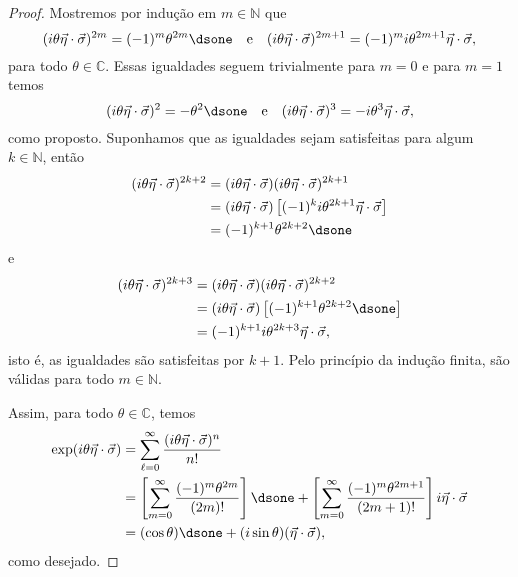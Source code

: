 \begin{proof}
    Mostremos por indução em \(m \in \mathbb{N}\) que
    \begin{equation*}
        (i\theta\vec \eta \cdot \vec \sigma)^{2m} = (-1)^m\theta^{2m}\dsone\quad\text{e}\quad(i\theta\vec \eta \cdot \vec \sigma)^{2m+1} = (-1)^{m}i\theta^{2m+1}\vec \eta \cdot \vec \sigma,
    \end{equation*}
    para todo \(\theta \in \mathbb{C}\). Essas igualdades seguem trivialmente para \(m = 0\) e para \(m = 1\) temos
    \begin{equation*}
        (i\theta \vec \eta\cdot \vec \sigma)^2 = - \theta^2 \dsone\quad\text{e}\quad(i\theta\vec\eta\cdot\vec\sigma)^3 = -i\theta^3 \vec \eta \cdot \vec \sigma,
    \end{equation*}
    como proposto. Suponhamos que as igualdades sejam satisfeitas para algum \(k \in \mathbb{N}\), então
    \begin{align*}
        (i\theta\vec \eta \cdot \vec \sigma)^{2k+2} &= (i\theta\vec \eta \cdot \vec \sigma)(i\theta\vec \eta \cdot \vec \sigma)^{2k+1}\\
                                                    &= (i\theta\vec \eta \cdot \vec \sigma)\left[(-1)^ki\theta^{2k+1}\vec \eta\cdot \vec \sigma\right]\\
                                                    &= (-1)^{k+1}\theta^{2k+2} \dsone
    \end{align*}
    e
    \begin{align*}
        (i\theta\vec \eta \cdot \vec \sigma)^{2k+3} &= (i\theta\vec \eta \cdot \vec \sigma)(i\theta\vec \eta \cdot \vec \sigma)^{2k+2}\\
                                                    &= (i\theta\vec \eta \cdot \vec \sigma)\left[(-1)^{k+1}\theta^{2k+2} \dsone\right]\\
                                                    &= (-1)^{k+1}i\theta^{2k+3}\vec \eta \cdot \vec \sigma,
    \end{align*}
    isto é, as igualdades são satisfeitas por \(k + 1\). Pelo princípio da indução finita, são válidas para todo \(m \in \mathbb{N}\).

    Assim, para todo \(\theta \in \mathbb{C}\), temos
    \begin{align*}
        \exp(i\theta \vec \eta \cdot \vec \sigma) &= \sum_{\ell = 0}^{\infty} \frac{(i \theta \vec \eta \cdot \vec \sigma)^n}{n!}\\
                                                  &= \left[\sum_{m = 0}^{\infty} \frac{(-1)^{m}\theta^{2m}}{(2m)!}\right] \dsone + \left[\sum_{m=0}^\infty\frac{(-1)^m \theta^{2m+1}}{(2m+1)!}\right] i \vec \eta \cdot \vec \sigma\\
                                                  &= (\cos\theta)\dsone + (i\sin\theta)(\vec \eta \cdot \vec \sigma),
    \end{align*}
    como desejado.
\end{proof}


